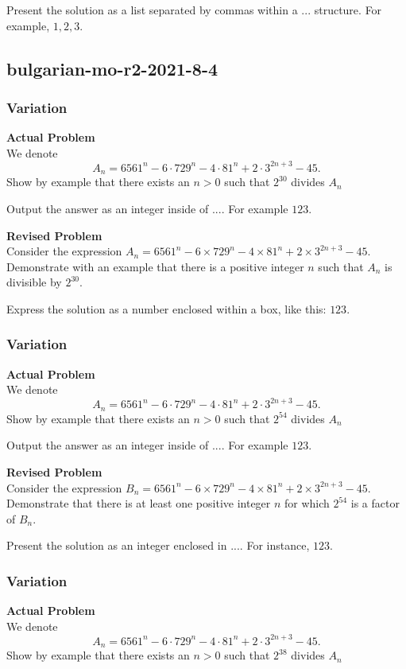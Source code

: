 Present the solution as a list separated by commas within a $\boxed{...}$ structure. For example, $\boxed{1, 2, 3}$.

\subsection{bulgarian-mo-r2-2021-8-4}
\subsubsection{Variation}
\textbf{Actual Problem}\\
We denote $$ A_{n} = 6561^{n} - 6 \cdot 729^{n} - 4 \cdot 81^{n} + 2 \cdot 3^{2 n + 3} - 45. $$ Show by example that there exists an $n>0$ such that $2^{30}$ divides $A_{n}$

Output the answer as an integer inside of $\boxed{...}$. For example $\boxed{123}$.

\textbf{Revised Problem}\\
Consider the expression \( A_{n} = 6561^{n} - 6 \times 729^{n} - 4 \times 81^{n} + 2 \times 3^{2n + 3} - 45 \). Demonstrate with an example that there is a positive integer \( n \) such that \( A_n \) is divisible by \( 2^{30} \).

Express the solution as a number enclosed within a box, like this: \(\boxed{123}\).

\subsubsection{Variation}
\textbf{Actual Problem}\\
We denote $$ A_{n} = 6561^{n} - 6 \cdot 729^{n} - 4 \cdot 81^{n} + 2 \cdot 3^{2 n + 3} - 45. $$ Show by example that there exists an $n>0$ such that $2^{54}$ divides $A_{n}$

Output the answer as an integer inside of $\boxed{...}$. For example $\boxed{123}$.

\textbf{Revised Problem}\\
Consider the expression \( B_n = 6561^n - 6 \times 729^n - 4 \times 81^n + 2 \times 3^{2n+3} - 45 \). Demonstrate that there is at least one positive integer \( n \) for which \( 2^{54} \) is a factor of \( B_n \).

Present the solution as an integer enclosed in \(\boxed{...}\). For instance, \(\boxed{123}\).

\subsubsection{Variation}
\textbf{Actual Problem}\\
We denote $$ A_{n} = 6561^{n} - 6 \cdot 729^{n} - 4 \cdot 81^{n} + 2 \cdot 3^{2 n + 3} - 45. $$ Show by example that there exists an $n>0$ such that $2^{38}$ divides $A_{n}$

